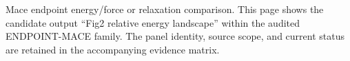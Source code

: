 Mace endpoint energy/force or relaxation comparison. This page shows the candidate output ``Fig2 relative energy landscape'' within the audited ENDPOINT-MACE family. The panel identity, source scope, and current status are retained in the accompanying evidence matrix.
